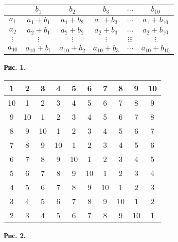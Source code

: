 \section*{}
\noindent
\begin{minipage}[t]{0.4\textwidth}
\begin{center}
\renewcommand{\arraystretch}{2.6}
\setlength{\tabcolsep}{4.2pt}
\begin{tabular}{c|c|c|c|c|c}
& $b_1$ & $b_2$ & $b_3$ & $\dots$ & $b_{10}$ \\
\hline
$a_1$ & $a_1 + b_1$ & $a_1 + b_2$ & $a_1 + b_3$ & $\dots$ & $a_1 + b_{10}$ \\
\hline
$a_2$ & $a_2 + b_1$ & $a_2 + b_2$ & $a_2 + b_3$ & $\dots$ & $a_2 + b_{10}$ \\
\hline
$\vdots$ & $\vdots$ & $\vdots$ & $\vdots$ & $\vdots \vdots \vdots$ & $\vdots$ \\
\hline
$a_{10}$ & $a_{10} + b_1$ & $a_{10} + b_2$ & $a_{10} + b_3$ & $\dots$ & $a_{10} + b_{10}$ \\
\hline
\end{tabular}
\end{center}
\vspace{0.1cm}
\textbf{Рис. 1.}
\end{minipage}
\hfill
\begin{minipage}[t]{0.45\textwidth}
\begin{center}
\renewcommand{\arraystretch}{1.3}
\setlength{\tabcolsep}{7.2pt}
\begin{tabular}{|c|c|c|c|c|c|c|c|c|c|}
\hline
1 & 2 & 3 & 4 & 5 & 6 & 7 & 8 & 9 & 10 \\ \hline
10 & 1 & 2 & 3 & 4 & 5 & 6 & 7 & 8 & 9 \\ \hline
9 & 10 & 1 & 2 & 3 & 4 & 5 & 6 & 7 & 8 \\ \hline
8 & 9 & 10 & 1 & 2 & 3 & 4 & 5 & 6 & 7 \\ \hline
7 & 8 & 9 & 10 & 1 & 2 & 3 & 4 & 5 & 6 \\ \hline
6 & 7 & 8 & 9 & 10 & 1 & 2 & 3 & 4 & 5 \\ \hline
5 & 6 & 7 & 8 & 9 & 10 & 1 & 2 & 3 & 4 \\ \hline
4 & 5 & 6 & 7 & 8 & 9 & 10 & 1 & 2 & 3 \\ \hline
3 & 4 & 5 & 6 & 7 & 8 & 9 & 10 & 1 & 2 \\ \hline
2 & 3 & 4 & 5 & 6 & 7 & 8 & 9 & 10 & 1 \\ \hline
\end{tabular}
\end{center}
\vspace{0.04cm}
\textbf{Рис. 2.}
\end{minipage}

